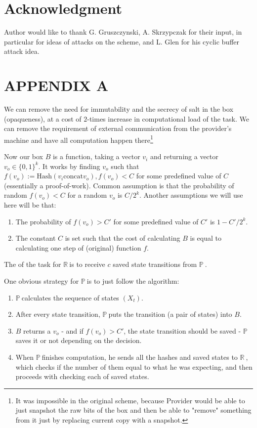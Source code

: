 \documentclass{winnower}
\newcommand{\R}{$\mathbb{R\ }$}
\newcommand{\X}{$\mathbb{P\ }$}
\begin{document}
\section*{Acknowledgment}

Author would like to thank G. Gruszczynski, A. Skrzypczak for their input, in particular for ideas of attacks on the scheme, and L. Glen for his cyclic buffer attack idea.

\newpage
\section*{APPENDIX A}

We can remove the need for immutability and the secrecy of salt in the box (opaqueness), at a cost of $2$-times increase in computational load of the task. We can remove the requirement of external communication from the provider's machine and have all computation happen there\footnote{It was impossible in the original scheme, because Provider would be able to just snapshot the raw bits of the box and then be able to "remove" something from it just by replacing current copy with a snapshot.}

Now our box $B$ is a function, taking a vector $v_i$ and returning a vector $v_o \in \{0, 1\}^{k}$.
It works by finding $v_o$ such that $ f(v_o) := \textrm{Hash}(v_i \textrm{concat} v_o), f(v_o) < C$ for some predefined value of $C$ (essentially a proof-of-work). Common assumption is that the probability of random $f(v_o) < C$ for a random $v_o$ is $C/2^{k}$. Another assumptions we will use here will be that:
\begin{enumerate}
\item The probability of $f(v_o) > C'$ for some predefined value of $C'$ is $1-C'/2^{k}$.
\item The constant $C$ is set such that the cost of calculating $B$ is equal to calculating one step of (original) function $f$.
\end{enumerate}

The of the task for \R is to receive $c$ saved state transitions from \X.   

One obvious strategy for \X is to just follow the algorithm:
\begin{enumerate}
 \item \X calculates the sequence of states $(X_t)$.  
 \item After every state transition, \X puts the transition (a pair of states) into $B$.
 \item $B$ returns a $v_o$ - and if $f(v_o) > C'$, the state transition should be saved - \X saves it or not depending on the decision.
 \item When \X finishes computation, he sends all the hashes and saved states to \R, which checks if the number of them equal to what he was expecting, and then proceeds with checking each of saved states.
\end{enumerate}
\end{document}
